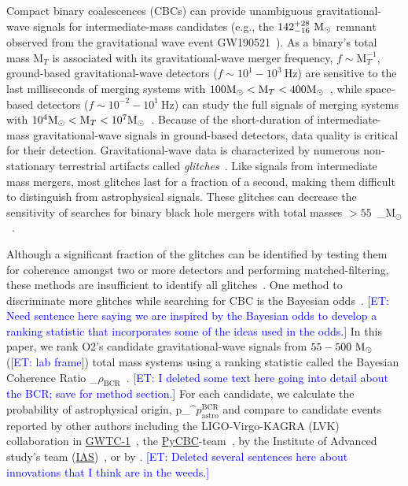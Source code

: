 \documentclass[%
 nofootinbib,
 amsmath,amssymb,
 aps,
 twocolumn,
 superscriptaddress
]{revtex4-2}
\newcommand{\pycbc}{{\sc \href{https://pycbc.org/}{{PyCBC}}}\xspace}
\newcommand{\GWTC}{{\sc \href{https://ui.adsabs.harvard.edu/abs/2019PhRvX...9c1040A/abstract}{{GWTC-1}}}\xspace}
\newcommand{\IAS}{{\sc \href{https://ui.adsabs.harvard.edu/abs/2020PhRvD.101h3030V/abstract}{{IAS}}}\xspace}
\newcommand{\fancytext}[1]{{\relax\ifmmode#1\else $#1$\fi}\xspace}
\newcommand{\mathcmd}[1]{{\sc \relax\ifmmode#1\else $#1$\fi}\xspace}
\newcommand{\bcr}{\mathcmd{\rho_\text{BCR}}}
\newcommand{\msun}{\mathcmd{\text{M}_\odot}}
\newcommand{\pastrobcr}{\fancytext{p_\text{astro}^{\text{BCR}}}}
\newcommand{\et}[1]{\textcolor{blue}{[ET: #1]}}
\begin{document}
Compact binary coalescences (CBCs) can provide unambiguous gravitational-wave signals for intermediate-mass candidates (e.g., the $142^{+28}_{-16}\ \msun$ remnant observed from the gravitational wave event GW190521~\cite{Abbott:2020:PhRvL}). As a binary's total mass $\text{M}_{T}$ is associated with its gravitational-wave merger frequency, $f\sim \text{M}_{T}^{-1}$,  ground-based gravitational-wave detectors ($f\sim 10^1 - 10^3\ \text{Hz}$) are sensitive to the last milliseconds of merging systems with $100 \msun < \text{M}_{T} < 400 \msun$~\cite{LIGOScientificCollaboration:2015:CQGra, Martynov:2016:PhRvD, Moore_2014}, while space-based detectors ($f \sim 10^{-2} - 10^1\ \text{Hz}$) can study the full signals of merging systems with $10^4 \msun < \text{M}_{T} < 10^7 \msun$~\cite{ Moore_2014, Lu:2019:PhRvD}. Because of the short-duration of intermediate-mass gravitational-wave signals in ground-based detectors, data quality is critical for their detection. Gravitational-wave data is characterized by numerous non-stationary terrestrial artifacts called \textit{glitches}~\cite{ pycbc_short_duration_transients, pe_with_glitch, blip_glitches}. Like signals from intermediate mass mergers, most glitches last for a fraction of a second, making them difficult to distinguish from astrophysical signals. These glitches can decrease the sensitivity of searches for binary black hole mergers with total masses $>55$~\msun ~\cite{pycbc_short_duration_transients}.

Although a significant fraction of the glitches can be identified by testing them for coherence amongst two or more detectors and performing matched-filtering, these methods are insufficient to identify all glitches~\cite{ pycbc_short_duration_transients, pe_with_glitch, blip_glitches}. One method to discriminate more glitches while searching for CBC is the Bayesian odds~\cite{bci, kanner2016leveraging, BCR1, BCR2, bcr_gw151216, bayesian_odds}. \et{Need sentence here saying we are inspired by the Bayesian odds to develop a ranking statistic that incorporates some of the ideas used in the odds.} In this paper, we rank O2's candidate gravitational-wave signals from $55-500\ \msun$ (\et{lab frame}) total mass systems using a ranking statistic called the Bayesian Coherence Ratio \bcr~\cite{BCR1}. \et{I deleted some text here going into detail about the BCR; save for method section.} For each candidate, we calculate the probability of astrophysical origin, \pastrobcr and compare to candidate events reported by other authors including the LIGO-Virgo-KAGRA (LVK) collaboration in \GWTC~\cite{GWTC1}, the \pycbc-team~\cite{pycbc_code, pycbc_og0, pycbc_og1, pycbc_og2, pycbc_og3, pycbc_og4, pycbc_og5, pycbc_og6, pycbc_single_det, pycbc_ogc_2}, by the Institute of Advanced study's team (\IAS)~\cite{IAS0, IAS1, IAS2}, or by \citet{bayesian_odds}. \et{Deleted several sentences here about innovations that I think are in the weeds.}
\end{document}
